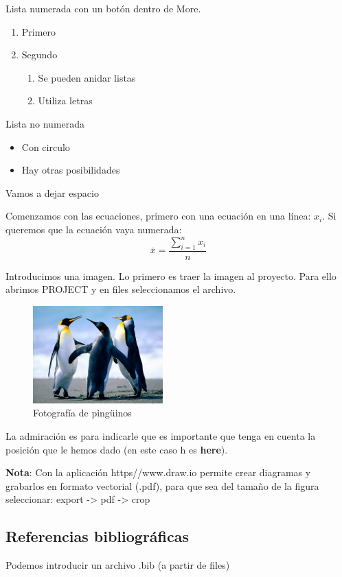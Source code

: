 \documentclass[a4paper]{article}
\begin{document}
Lista numerada con un botón dentro de More.
\begin{enumerate}
\item Primero
\item Segundo
\begin{enumerate}
\item Se pueden anidar listas
\item Utiliza letras
\end{enumerate}
\end{enumerate}

Lista no numerada
\begin{itemize}
\item Con circulo
\item Hay otras posibilidades
\end{itemize}

Vamos a dejar espacio
\vspace{1cm}

Comenzamos con las ecuaciones, primero con una ecuación en una línea: \(x_i\). Si queremos que la ecuación vaya numerada:
\[\bar{x} = \frac{\sum_{i=1}^n x_i}{n}\]

Introducimos una imagen. Lo primero es traer la imagen al proyecto. Para ello abrimos PROJECT y en files seleccionamos el archivo.
\begin{figure}[h!]
\centering
\includegraphics[width=5cm]{Penguins.jpg}
\caption{Fotografía de ping\"uinos}
\end{figure}
La admiración es para indicarle que es importante que tenga en cuenta la posición que le hemos dado (en este caso h es \textbf{here}).

\textbf{Nota}:  
Con la aplicación https//www.draw.io permite crear diagramas y grabarlos en formato vectorial (.pdf), para que sea del tamaño de la figura seleccionar: export -> pdf -> crop


\subsection{Referencias bibliográficas}

Podemos introducir un archivo .bib (a partir de files)
\end{document}

